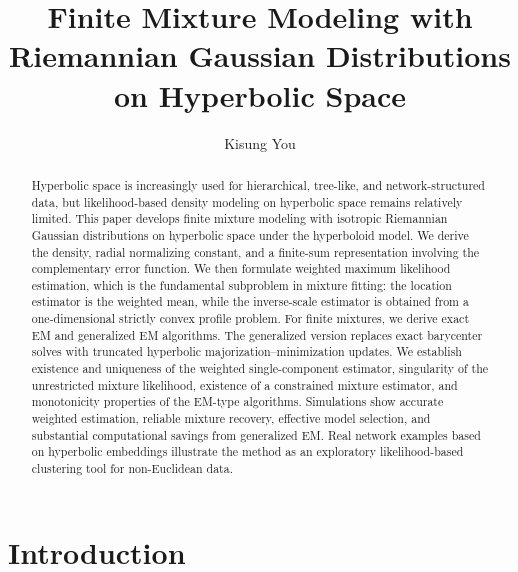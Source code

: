\documentclass[11pt]{article}
\begin{document}
	
\title{Finite Mixture Modeling with Riemannian Gaussian Distributions on Hyperbolic Space}
\author[1,2]{Kisung You}
\date{}

\maketitle
\begin{abstract}
Hyperbolic space is increasingly used for hierarchical, tree-like, and network-structured data, but likelihood-based density modeling on hyperbolic space remains relatively limited. This paper develops finite mixture modeling with isotropic Riemannian Gaussian distributions on hyperbolic space under the hyperboloid model. We derive the density, radial normalizing constant, and a finite-sum representation involving the complementary error function.  We then formulate weighted maximum likelihood estimation, which is the fundamental subproblem in mixture fitting: the location estimator is the weighted \Frechet mean, while the inverse-scale estimator is obtained from a one-dimensional strictly convex profile problem. For finite mixtures, we derive exact EM and generalized EM algorithms. The generalized version replaces exact barycenter solves with truncated hyperbolic majorization--minimization updates. We establish existence and uniqueness of the weighted single-component estimator, singularity of the unrestricted mixture likelihood, existence of a constrained mixture estimator, and monotonicity properties of the EM-type algorithms. Simulations show accurate weighted estimation, reliable mixture recovery, effective model selection, and substantial computational savings from generalized EM. Real network examples based on hyperbolic embeddings illustrate the method as an exploratory likelihood-based clustering tool for non-Euclidean data.
\end{abstract}



\section{Introduction}
\end{document}
